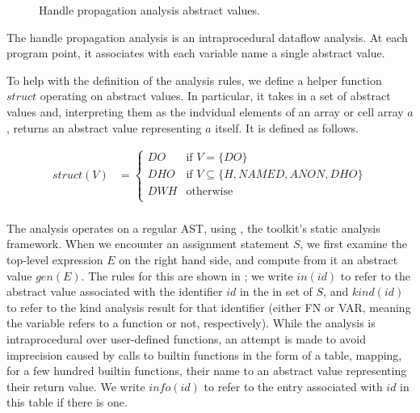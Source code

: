 \begin{figure}
\centering
{}
\caption{Handle propagation analysis abstract values.}
\label{fig:HandleLattice}
\end{figure}

The handle propagation analysis is an intraprocedural dataflow analysis. At
each program point, it associates with each variable name a single abstract
value.

To help with the definition of the analysis rules, we define a helper function
$struct$ operating on abstract values. In particular, it takes in a set of
abstract values and, interpreting them as the indvidual elements of an array or
cell array $a$, returns an abstract value representing $a$ itself. It is
defined as follows.

\begin{align*}
struct(V) &= \begin{cases}
  DO & \text{if } V = \lbrace DO \rbrace \\
  DHO & \text{if } V \subseteq \lbrace H, NAMED, ANON, DHO \rbrace \\
  DWH & \text{otherwise} \\
\end{cases} \\
\end{align*}

The analysis operates on a regular \matlab AST, using \mcsaf, the \mclab
toolkit's static analysis framework. When we encounter an assignment statement
$S$, we first examine the top-level expression $E$ on the right hand side, and
compute from it an abstract value $gen(E)$. The rules for this are shown in
; we write $in(id)$ to refer to the abstract
value associated with the identifier $id$ in the in set of $S$, and $kind(id)$
to refer to the kind analysis result for that identifier (either FN or VAR,
meaning the variable refers to a function or not, respectively). While the
analysis is intraprocedural over user-defined functions, an attempt is made
to avoid imprecision caused by calls to builtin functions in the form of a
table, mapping, for a few hundred builtin functions, their name to an abstract
value representing their return value. We write $info(id)$ to refer to the
entry associated with $id$ in this table if there is one.

